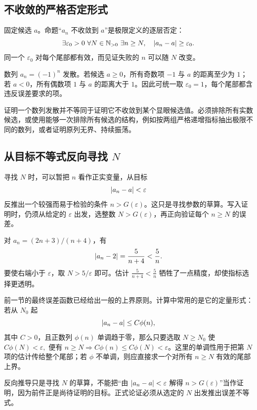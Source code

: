 \subsection{不收敛的严格否定形式}

固定候选 \(a\)。命题“\(a_n\) 不收敛到 \(a\)”是极限定义的逐层否定：
\[
\exists\varepsilon_0>0\ \forall N\in\mathbb{N}_{>0}\ \exists n\ge N,
 \quad \left|a_n-a\right|\ge\varepsilon_0.
\]
同一个 \(\varepsilon_0\) 对每个尾部都有效，而见证失败的 \(n\) 可以随 \(N\) 改变。

\begin{example}
数列 \(a_n=(-1)^n\) 发散。若候选 \(a\ge0\)，所有奇数项 \(-1\) 与 \(a\) 的距离至少为 \(1\)；若 \(a<0\)，所有偶数项 \(1\) 与 \(a\) 的距离大于 \(1\)。因此可统一取 \(\varepsilon_0=1\)，每个尾部都含违反误差要求的项。
\end{example}

证明一个数列发散并不等同于证明它不收敛到某个显眼候选值。必须排除所有实数候选，或使用能够一次排除所有候选的结构，例如按两组严格递增指标抽出极限不同的数列，或者证明原列无界、持续振荡。

\subsection{从目标不等式反向寻找 \texorpdfstring{\(N\)}{N}}

寻找 \(N\) 时，可以暂把 \(n\) 看作正实变量，从目标
\[
 \left|a_n-a\right|<\varepsilon
\]
反推出一个较强而易于检验的条件 \(n>G(\varepsilon)\)。这只是寻找参数的草算。写入证明时，仍须从给定的 \(\varepsilon\) 出发，选整数 \(N>G(\varepsilon)\)，再正向验证每个 \(n\ge N\) 的误差。

\begin{example}
对 \(a_n=(2n+3)/(n+4)\)，有
\[
 \left|a_n-2\right|=\frac5{n+4}<\frac5n.
\]
要使右端小于 \(\varepsilon\)，取 \(N>5/\varepsilon\) 即可。估计 \(\frac5{n+4}<\frac5n\) 牺牲了一点精度，却使指标选择更透明。
\end{example}

前一节的最终误差函数已经给出一般的上界原则。计算中常用的是它的定量形式：若从 \(N_0\) 起
\[
 \left|a_n-a\right|\le C\phi(n),
\]
其中 \(C>0\)，且正数列 \(\phi(n)\) 单调趋于零，那么只要选取 \(N\ge N_0\) 使
\(
 C\phi(N)<\varepsilon,
\)
便有 \(n\ge N\Rightarrow C\phi(n)\le C\phi(N)<\varepsilon\)。这里的单调性用于把第 \(N\) 项的估计传给整个尾部；若 \(\phi\) 不单调，则应直接求一个对所有 \(n\ge N\) 有效的尾部上界。

反向推导只是寻找 \(N\) 的草算，不能把“由 \(\left|a_n-a\right|<\varepsilon\) 解得 \(n>G(\varepsilon)\)”当作证明，因为前件正是尚待证明的目标。正式论证必须从选定的 \(N\) 出发推出误差不等式。

